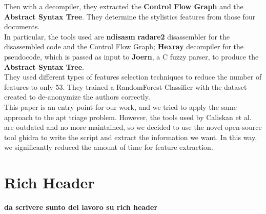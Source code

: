 Then with a decompiler, they extracted the \textbf{Control Flow Graph} and the \textbf{Abstract Syntax Tree}. They determine the stylistics features from those four documents.
\\
In particular, the tools used are \textbf{ndisasm} \textbf{radare2} disassembler for the disassembled code and the Control Flow Graph; \textbf{Hexray} decompiler for the pseudocode, which is passed as input to \textbf{Joern}, a C fuzzy parser, to produce the  \textbf{Abstract Syntax Tree}.\\

They used different types of features selection techniques to reduce the number of features to only 53. They trained a RandomForest Classifier with the dataset created to de-anonymize the authors correctly. \\

This paper is an entry point for our work, and we tried to apply the same approach to the apt triage problem. However, the tools used by Caliskan et al. are outdated and no more maintained, so we decided to use the novel open-source tool ghidra to write the script and extract the information we want. In this way, we significantly reduced the amount of time for feature extraction.



\section{Rich Header}
\textbf{da scrivere sunto del lavoro su rich header}
\cite{dubyk2019sans}
